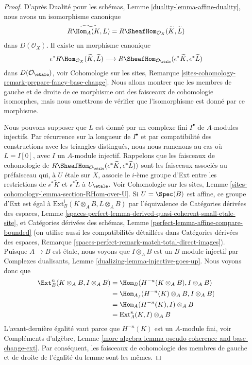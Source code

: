 \begin{proof}
D'après Dualité pour les schémas, Lemme \ref{duality-lemma-affine-duality},
nous avons un isomorphisme canonique
$$
\widetilde{R\Hom_A(K, L)} =
R\SheafHom_{\mathcal{O}_X}(\widetilde{K}, \widetilde{L})
$$
dans $D(\mathcal{O}_X)$. Il existe un morphisme canonique
$$
\epsilon^*R\Hom_{\mathcal{O}_X}(\widetilde{K}, \widetilde{L})
\longrightarrow
R\SheafHom_{\mathcal{O}_\etale}(\epsilon^*\widetilde{K},
\epsilon^*\widetilde{L})
$$
dans $D(\mathcal{O}_\etale)$, voir Cohomologie sur les sites, Remarque
\ref{sites-cohomology-remark-prepare-fancy-base-change}.
Nous allons montrer que les membres de gauche et de droite de ce morphisme
ont des faisceaux de cohomologie isomorphes, mais nous omettrons de
vérifier que l'isomorphisme est donné par ce morphisme.

\medskip\noindent
Nous pouvons supposer que $L$ est donné par un complexe fini $I^\bullet$
de $A$-modules injectifs. Par récurrence sur la longueur de $I^\bullet$
et par compatibilité des constructions avec les triangles distingués,
nous nous ramenons au cas où $L = I[0]$, avec $I$ un $A$-module injectif.
Rappelons que les faisceaux de cohomologie de
$R\SheafHom_{\mathcal{O}_\etale}(\epsilon^*\widetilde{K},
\epsilon^*\widetilde{L}))$
sont les faisceaux associés au préfaisceau qui, à $U$ \'etale
sur $X$, associe le $i$-ème groupe d'Ext entre les restrictions de
$\epsilon^*\widetilde{K}$ et $\epsilon^*\widetilde{L}$
à $U_\etale$. Voir
Cohomologie sur les sites, Lemme
\ref{sites-cohomology-lemma-section-RHom-over-U}.
Si $U = \Spec(B)$ est affine, ce groupe d'Ext
est égal à $\text{Ext}^i_B(K \otimes_A B, L \otimes_A B)$
par l'équivalence de
Catégories dérivées des espaces, Lemme
\ref{spaces-perfect-lemma-derived-quasi-coherent-small-etale-site}, et
Catégories dérivées des schémas, Lemme
\ref{perfect-lemma-affine-compare-bounded}
(on utilise aussi les compatibilités détaillées dans
Catégories dérivées des espaces, Remarque
\ref{spaces-perfect-remark-match-total-direct-images}).
Puisque $A \to B$ est \'etale, nous voyons que
$I \otimes_A B$ est un $B$-module injectif
par Complexes dualisants, Lemme \ref{dualizing-lemma-injective-goes-up}.
Nous voyons donc que
\begin{align*}
\Ext^n_B(K \otimes_A B, I \otimes_A B)
& =
\Hom_B(H^{-n}(K \otimes_A B), I \otimes_A B) \\
& =
\Hom_{A_f}(H^{-n}(K) \otimes_A B, I \otimes_A B) \\
& =
\Hom_A(H^{-n}(K), I) \otimes_A B \\
& =
\text{Ext}^n_A(K, I) \otimes_A B
\end{align*}
L'avant-dernière égalité vaut parce que $H^{-n}(K)$ est un $A$-module fini, voir
Compléments d'algèbre, Lemme
\ref{more-algebra-lemma-pseudo-coherence-and-base-change-ext}.
Par conséquent, les faisceaux de cohomologie des membres de gauche et de droite
de l'égalité du lemme sont les mêmes.
\end{proof}

